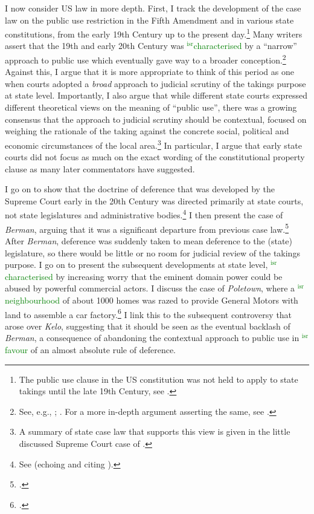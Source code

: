 \documentclass[12pt,a4paper]{book} %
\newcommand{\isr}[1]{\textcolor{green}{$^{\textrm{isr}}${#1}}}
\begin{document}
I now consider US law in more depth. First, I track the development of the case law on the public use restriction in the Fifth Amendment and in various state constitutions, from the early 19th Century up to the present day.\footnote{The public use clause in the US constitution was not held to apply to state takings until the late 19th Century, see \cite{chicago97}.} Many writers assert that the 19th and early 20th Century was \isr{characterised} by a ``narrow'' approach to public use which eventually gave way to a broader conception.\footnote{See, e.g., \cite[483]{walt11}; \cite[203-204]{allen00}. For a more in-depth argument asserting the same, see \cite{nichols40}.} Against this, I argue that it is more appropriate to think of this period as one when courts adopted a {\it broad} approach to judicial scrutiny of the takings purpose at state level. Importantly, I also argue that while different state courts expressed different theoretical views on the meaning of ``public use'', there was a growing consensus that the approach to judicial scrutiny should be contextual, focused on weighing the rationale of the taking against the concrete social, political and economic circumstances of the local area.\footnote{A summary of state case law that supports this view is given in the little discussed Supreme Court case of \cite{hairston08}.}  In particular, I argue that early state courts did not focus as much on the exact wording of the constitutional property clause as many later commentators have suggested.

I go on to show that the doctrine of deference that was developed by the Supreme Court early in the 20th Century was directed primarily at state courts, not state legislatures and administrative bodies.\footnote{See \cite{vester30} (echoing and citing \cite{hairston08}).} I then present the case of {\it Berman}, arguing that it was a significant departure from previous case law.\footcite{berman54} After {\it Berman}, deference was suddenly taken to mean deference to the (state) legislature, so there would be little or no room for judicial review of the takings purpose. I go on to present the subsequent developments at state level, \isr{characterised} by increasing worry that the eminent domain power could be abused by powerful commercial actors. I discuss the case of {\it Poletown}, where a \isr{neighbourhood} of about 1000 homes was razed to provide General Motors with land to assemble a car factory.\footcite{poletown81} I link this to the subsequent controversy that arose over {\it Kelo}, suggesting that it should be seen as the eventual backlash of {\it Berman}, a consequence of abandoning the contextual approach to public use in \isr{favour} of an almost absolute rule of deference.
\end{document}

